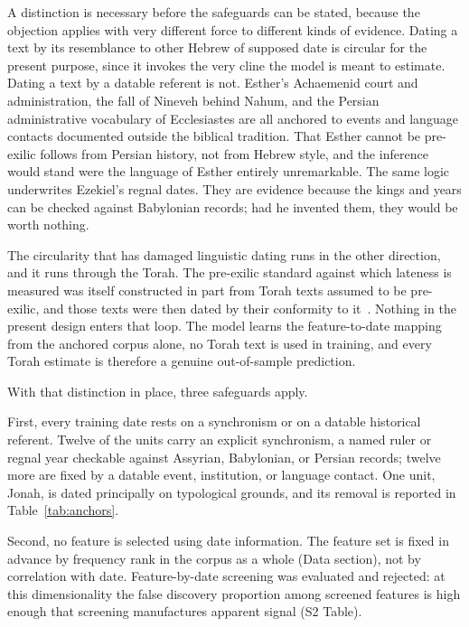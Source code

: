 \documentclass[10pt,letterpaper]{article}
\begin{document}
A distinction is necessary before the safeguards can be stated, because the
objection applies with very different force to different kinds of evidence.
Dating a text by its resemblance to other Hebrew of supposed date is circular
for the present purpose, since it invokes the very cline the model is meant to
estimate.  Dating a text by a datable referent is not.  Esther's Achaemenid
court and administration, the fall of Nineveh behind Nahum, and the Persian
administrative vocabulary of Ecclesiastes are all anchored to events and
language contacts documented outside the biblical tradition.  That Esther cannot
be pre-exilic follows from Persian history, not from Hebrew style, and the
inference would stand were the language of Esther entirely unremarkable.  The
same logic underwrites Ezekiel's regnal dates.  They are evidence because the
kings and years can be checked against Babylonian records; had he invented them,
they would be worth nothing.

The circularity that has damaged linguistic dating runs in the other direction,
and it runs through the Torah.  The pre-exilic standard against which lateness
is measured was itself constructed in part from Torah texts assumed to be
pre-exilic, and those texts were then dated by their conformity to
it~\cite{Young2008,Rezetko2014}.  Nothing in the present design enters that
loop.  The model learns the feature-to-date mapping from the anchored corpus
alone, no Torah text is used in training, and every Torah estimate is therefore
a genuine out-of-sample prediction.

With that distinction in place, three safeguards apply.

First, every training date rests on a synchronism or on a datable historical
referent.  Twelve of the \HBbooks{} units carry an explicit synchronism, a named
ruler or regnal year checkable against Assyrian, Babylonian, or Persian records;
twelve more are fixed by a datable event, institution, or language contact.
One unit, Jonah, is dated principally on typological grounds, and its removal is
reported in Table~\ref{tab:anchors}.

Second, no feature is selected using date information.  The feature set is
fixed in advance by frequency rank in the corpus as a whole (Data section),
not by correlation with date.  Feature-by-date screening was evaluated and
rejected: at this dimensionality the false discovery proportion among
screened features is high enough that screening manufactures apparent signal
(S2 Table).
\end{document}
